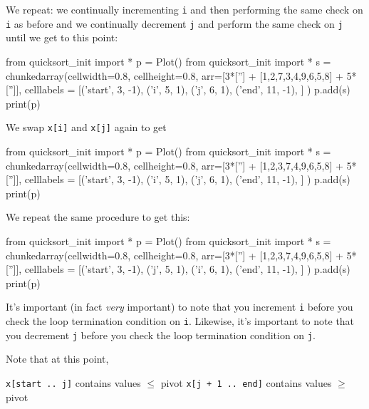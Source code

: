 We repeat: we continually incrementing \verb!i!
and then performing the same check on \verb!i! as before
and we continually decrement \verb!j! and perform the same check on
\verb!j!
until we get to this point:

\begin{python}
from quicksort_init import *
p = Plot()
from quicksort_init import *
s = chunkedarray(cellwidth=0.8, 
                   cellheight=0.8,
                   arr=[3*[''] + [1,2,7,3,4,9,6,5,8] + 5*['']],
                   celllabels = [('start', 3, -1),
                                 ('i', 5, 1),
                                 ('j', 6, 1),
                                 ('end',   11, -1),
                                ]
)
p.add(s)
print(p)
\end{python}

We swap \verb!x[i]! and \verb!x[j]! again to get

\begin{python}
from quicksort_init import *
p = Plot()
from quicksort_init import *
s = chunkedarray(cellwidth=0.8, 
                   cellheight=0.8,
                   arr=[3*[''] + [1,2,3,7,4,9,6,5,8] + 5*['']],
                   celllabels = [('start', 3, -1),
                                 ('i', 5, 1),
                                 ('j', 6, 1),
                                 ('end',   11, -1),
                                ]
)
p.add(s)
print(p)
\end{python}

We repeat the same procedure to get this:

\begin{python}
from quicksort_init import *
p = Plot()
from quicksort_init import *
s = chunkedarray(cellwidth=0.8, 
                   cellheight=0.8,
                   arr=[3*[''] + [1,2,3,7,4,9,6,5,8] + 5*['']],
                   celllabels = [('start', 3, -1),
                                 ('j', 5, 1),
                                 ('i', 6, 1),
                                 ('end',   11, -1),
                                ]
)
p.add(s)
print(p)
\end{python}

It's important (in fact \textit{very} important)
to note that you increment \verb!i! before
you check the loop termination condition on \verb!i!.
Likewise, it's important to  note that you decrement \verb!j!
before you check the loop termination condition on \verb!j!.

Note that at this point,
\begin{tightlist}
\li \verb!x[start .. j]! contains values $\leq$ pivot
\li \verb!x[j + 1 .. end]! contains values $\geq$ pivot
\end{tightlist}


